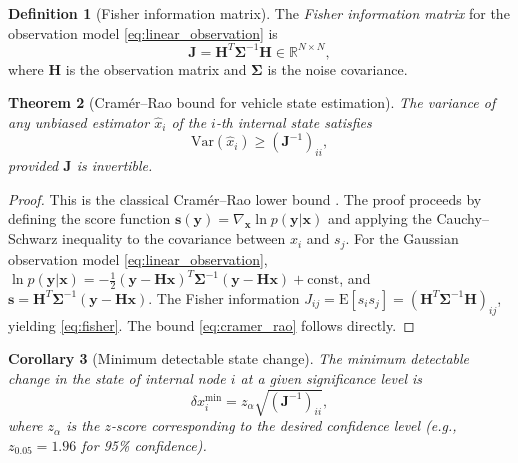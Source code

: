 \documentclass[twocolumn,10pt,a4paper]{article}
\newtheorem{theorem}{Theorem}[section]
\newtheorem{corollary}[theorem]{Corollary}
\theoremstyle{definition}
\newtheorem{definition}[theorem]{Definition}
\theoremstyle{remark}
\newcommand{\R}{\mathbb{R}}
\newcommand{\vect}[1]{\boldsymbol{#1}}
\newcommand{\mat}[1]{\mathbf{#1}}
\begin{document}
\begin{definition}[Fisher information matrix]\label{def:fisher}
The \emph{Fisher information matrix} for the observation model \eqref{eq:linear_observation} is \citep{Kay1993, CramerRao1945}
\begin{equation}\label{eq:fisher}
\mat{J} = \mat{H}^T \mat{\Sigma}^{-1} \mat{H} \in \R^{N \times N},
\end{equation}
where $\mat{H}$ is the observation matrix and $\mat{\Sigma}$ is the noise covariance.
\end{definition}

\begin{theorem}[Cram\'{e}r--Rao bound for vehicle state estimation]\label{thm:cramer_rao}
The variance of any unbiased estimator $\hat{x}_i$ of the $i$-th internal state satisfies
\begin{equation}\label{eq:cramer_rao}
\mathrm{Var}(\hat{x}_i) \geq (\mat{J}^{-1})_{ii},
\end{equation}
provided $\mat{J}$ is invertible.
\end{theorem}

\begin{proof}
This is the classical Cram\'{e}r--Rao lower bound \citep{CramerRao1945, Kay1993, VanTrees1968}. The proof proceeds by defining the score function $\vect{s}(\vect{y}) = \nabla_{\vect{x}} \ln p(\vect{y}|\vect{x})$ and applying the Cauchy--Schwarz inequality to the covariance between $\hat{x}_i$ and $s_j$. For the Gaussian observation model \eqref{eq:linear_observation}, $\ln p(\vect{y}|\vect{x}) = -\frac{1}{2}(\vect{y} - \mat{H}\vect{x})^T \mat{\Sigma}^{-1}(\vect{y} - \mat{H}\vect{x}) + \text{const}$, and $\vect{s} = \mat{H}^T \mat{\Sigma}^{-1}(\vect{y} - \mat{H}\vect{x})$. The Fisher information $J_{ij} = \mathrm{E}[s_i s_j] = (\mat{H}^T\mat{\Sigma}^{-1}\mat{H})_{ij}$, yielding \eqref{eq:fisher}. The bound \eqref{eq:cramer_rao} follows directly.
\end{proof}

\begin{corollary}[Minimum detectable state change]\label{cor:min_detectable}
The minimum detectable change in the state of internal node $i$ at a given significance level is
\begin{equation}\label{eq:min_detectable}
\delta x_i^{\min} = z_\alpha \sqrt{(\mat{J}^{-1})_{ii}},
\end{equation}
where $z_\alpha$ is the $z$-score corresponding to the desired confidence level (e.g., $z_{0.05} = 1.96$ for 95\% confidence).
\end{corollary}
\end{document}
